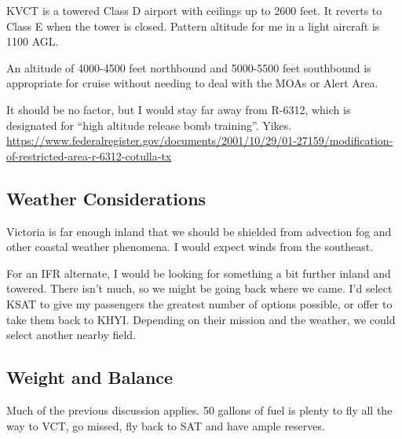 KVCT is a towered Class D airport with ceilings up to 2600 feet. It reverts to Class E when the tower is closed. Pattern altitude for me in a light aircraft is 1100 AGL.

An altitude of 4000-4500 feet northbound and 5000-5500 feet southbound is appropriate for cruise without needing to deal with the MOAs or Alert Area.

It should be no factor, but I would stay far away from R-6312, which is designated for ``high altitude release bomb training''. Yikes. \url{https://www.federalregister.gov/documents/2001/10/29/01-27159/modification-of-restricted-area-r-6312-cotulla-tx}

\subsection{Weather Considerations}

Victoria is far enough inland that we should be shielded from advection fog and other coastal weather phenomena. I would expect winds from the southeast.

For an IFR alternate, I would be looking for something a bit further inland and towered. There isn't much, so we might be going back where we came. I'd select KSAT to give my passengers the greatest number of options possible, or offer to take them back to KHYI. Depending on their mission and the weather, we could select another nearby field.

\subsection{Weight and Balance}

Much of the previous discussion applies. 50 gallons of fuel is plenty to fly all the way to VCT, go missed, fly back to SAT and have ample reserves.






